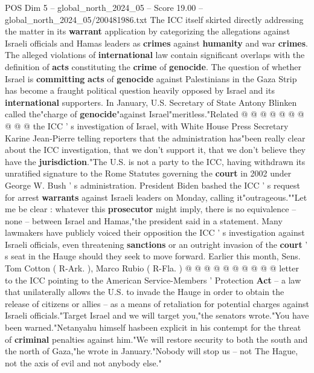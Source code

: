 \begin{textsample}{POS Dim 5 – global\_north\_2024\_05 – Score 19.00 – global\_north\_2024\_05/200481986.txt}
The ICC itself skirted directly addressing the matter in its \textbf{warrant} application by categorizing the allegations against Israeli officials and Hamas leaders as \textbf{crimes} against \textbf{humanity} and war \textbf{crimes}.
The alleged violations of \textbf{international} law contain significant overlaps with the definition of \textbf{acts} constituting the \textbf{crime} of \textbf{genocide}.
The question of whether Israel is \textbf{committing} \textbf{acts} of \textbf{genocide} against Palestinians in the Gaza Strip has become a fraught political question heavily opposed by Israel and its \textbf{international} supporters.
In January, U.S.
Secretary of State Antony Blinken called the"charge of \textbf{genocide}"against Israel"meritless."Related @ @ @ @ @ @ @ @ @ @ the ICC ' s investigation of Israel, with White House Press Secretary Karine Jean-Pierre telling reporters that the administration has"been really clear about the ICC investigation, that we don't support it, that we don't believe they have the \textbf{jurisdiction}."The U.S. is not a party to the ICC, having withdrawn its unratified signature to the Rome Statutes governing the \textbf{court} in 2002 under George W.
Bush ' s administration.
President Biden bashed the ICC ' s request for arrest \textbf{warrants} against Israeli leaders on Monday, calling it"outrageous.""Let me be clear : whatever this \textbf{prosecutor} might imply, there is no equivalence -- none -- between Israel and Hamas,"the president said in a statement.
Many lawmakers have publicly voiced their opposition the ICC ' s investigation against Israeli officials, even threatening \textbf{sanctions} or an outright invasion of the \textbf{court} ' s seat in the Hauge should they seek to move forward.
Earlier this month, Sens.
Tom Cotton ( R-Ark. ), Marco Rubio ( R-Fla. ) @ @ @ @ @ @ @ @ @ @ letter to the ICC pointing to the American Service-Members ' Protection \textbf{Act} -- a law that unilaterally allows the U.S. to invade the Hauge in order to obtain the release of citizens or allies -- as a means of retaliation for potential charges against Israeli officials."Target Israel and we will target you,"the senators wrote."You have been warned."Netanyahu himself hasbeen explicit in his contempt for the threat of \textbf{criminal} penalties against him."We will restore security to both the south and the north of Gaza,"he wrote in January."Nobody will stop us -- not The Hague, not the axis of evil and not anybody else."

\end{textsample}
